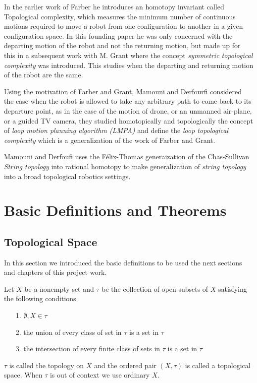 In the earlier work of Farber he introduces an homotopy invariant called Topological complexity, which measures the minimum number of continuous motions required to move a robot from one configuration to another in a given configuration space. In this founding paper he was only concerned with the departing motion of the robot and not the returning motion, but made up for this in a subsequent work with M. Grant where the concept \textit{symmetric topological complexity} was introduced. This studies when the departing and returning motion of the robot are the same.

Using the motivation of Farber and Grant, Mamouni and Derfourfi considered the case when the robot is allowed to take any arbitrary path to come back to its departure point, as in the case of the motion of drone, or an unmanned air-plane, or a guided TV camera, they studied homotopically and topologically the concept of \textit{loop motion planning algorithm (LMPA)}  and define the \textit{loop topological complexity} which is a generalization of the work of Farber and Grant.

Mamouni and Derfoufi uses the F\'elix-Thomas generaization of the Chas-Sullivan \textit{String topology} into rational homotopy to make generalization of \textit{string topology} into a broad topological robotics settings.


\chapter{Basic Definitions and Theorems}

\section{Topological Space}
In this section we introduced the basic definitions to be used the next sections and chapters of this project work.

\begin{defn}
    Let $X$ be a nonempty set and $\tau$ be the collection of open subsets of $X$ satisfying the following conditions
    \begin{itemize}
        \item[1.] $\emptyset, X \in \tau$
        \item[2.] the union of every class of set in $\tau$ is a set in $\tau$
        \item[3.] the intersection of every finite class of sets in $\tau$ is a set in $\tau$
    \end{itemize}
    $\tau$ is called the topology on $X$ and the ordered pair $(X, \tau)$ is called a topological space. When $\tau$ is out of context we use ordinary $X$.
\end{defn}

